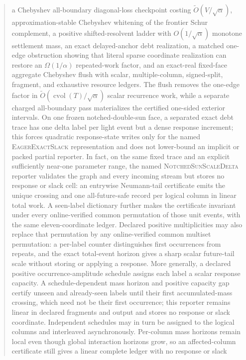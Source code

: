 \documentclass[11pt]{article}
\begin{document}
\begin{abstract}
a Chebyshev all-boundary diagonal-loss checkpoint costing
$\widetilde O(V/\sqrt\alpha)$, approximation-stable Chebyshev whitening of
the frontier Schur complement, a positive shifted-resolvent ladder with
$O(1/\sqrt\alpha)$ monotone settlement mass, an exact delayed-anchor debt
realization, a matched one-edge obstruction showing that literal sparse
coordinate realization can restore an $\Omega(1/\alpha)$ repeated-work
factor, and an exact-real fixed-face aggregate Chebyshev flush with scalar,
multiple-column, signed-split, fragment, and exhaustive resource ledgers.
The flush removes the one-edge factor in
$\widetilde O(\operatorname{cvol}(T)/\sqrt\alpha)$ scalar recurrence work,
while a separate charged all-boundary pass materializes the certified
one-sided exterior intervals.  On one frozen notched-double-sun face, a
separated exact debt trace has one delta label per light event but a dense
response increment; this forces quadratic response-state writes only for the
named \textsc{EagerExactSlack} representation and does not lower-bound an
implicit or packed partial reporter.  In fact, on the same fixed trace and an
explicit sufficiently near-one parameter range, the named
\textsc{NotchedSunScaleDelta} reporter validates the graph and every incoming
stream but stores no response or slack cell: an entrywise Neumann-tail
certificate emits the unique crossing and one all-future-safe record per
logical column in linear total work.  A seen-label dictionary further makes
the certificate invariant under every online-verified common permutation of
those unit events, with the same eleven-coordinate ledger.  Declared positive
multiplicities may also replace that permutation by any online-verified common
multiset permutation: a per-label counter distinguishes first occurrences
from repeats, and the exact total-event horizon gives a sharp scalar
future-tail scale without storing or applying a response.  More generally, a
declared positive occurrence-amplitude schedule assigns each label a scalar
response capacity.  A schedule-dependent mass horizon and positive capacity
gap certify unseen and already-seen labels until their first accumulated-mass
crossing, which need not be their first occurrence; this reporter remains
linear in declared fragments and output and stores no response or slack
coordinate.  Independent schedules may in turn be assigned to the logical
columns and interleaved asynchronously.  Per-column mass horizons remain
local even though global interaction horizons grow, so an affected-column
certificate still gives a linear complete ledger with no response or slack

\end{abstract}
\end{document}

